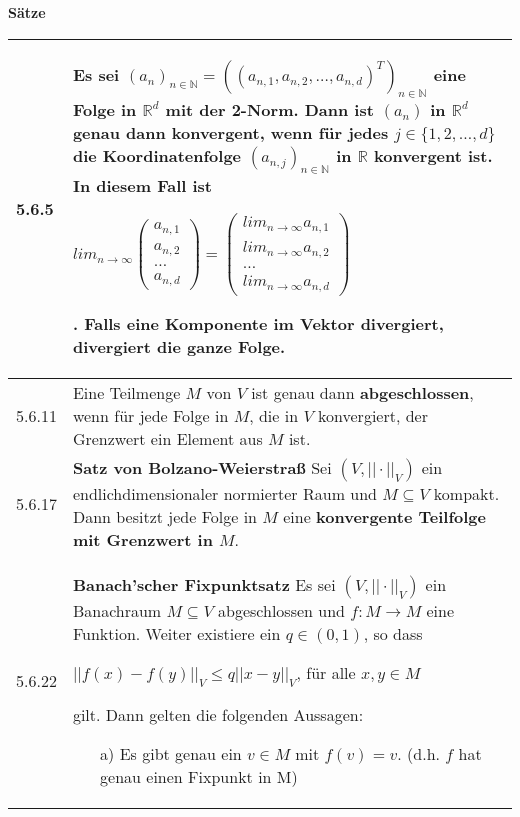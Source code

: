 \noindent 
\textbf{Sätze}
\begin{table}[H]
\begin{tabularx}{\textwidth}{X m{16cm}}
    \toprule

    5.6.5 & Es sei $(a_n)_{n \in \mathbb{N}} = ((a_{n,1}, a_{n,2}, \dots, a_{n,d})^T)_{n \in \mathbb{N}}$ eine Folge in $\mathbb{R}^d$
            mit der 2-Norm. Dann ist $(a_n)$ in $\mathbb{R}^d$ genau dann \textbf{konvergent}, wenn für jedes $j \in \{1,2,\dots,d\}$ die
            Koordinatenfolge $(a_{n,j})_{n \in \mathbb{N}}$ in $\mathbb{R}$ \textbf{konvergent} ist. In diesem Fall ist \hfill \break
            \centerline{$lim_{n \rightarrow \infty}\begin{pmatrix}a_{n,1}\\a_{n,2}\\\dots \\ a_{n,d}\end{pmatrix} =
                \begin{pmatrix} lim_{n \rightarrow \infty} a_{n,1} \\ lim_{n \rightarrow \infty} a_{n,2} \\ \dots \\
                lim_{n \rightarrow \infty} a_{n,d} \end{pmatrix}$}.
            Falls eine Komponente im Vektor divergiert, divergiert die ganze Folge. \\
    \midrule
    5.6.11& Eine Teilmenge $M$ von $V$ ist genau dann \textbf{abgeschlossen}, wenn für jede Folge in $M$, die in $V$ konvergiert,
            der Grenzwert ein Element aus $M$ ist. \\
    \midrule
    5.6.17& \textbf{Satz von Bolzano-Weierstra\ss} \hfill \break
            Sei $(V, ||\cdot||_V)$ ein endlichdimensionaler normierter Raum und $M \subseteq V$ kompakt. Dann besitzt jede Folge in $M$
            eine \textbf{konvergente Teilfolge mit Grenzwert in $M$}. \\
    \midrule
    5.6.22& \textbf{Banach'scher Fixpunktsatz} \hfill \break
            Es sei $(V, ||\cdot||_V)$ ein Banachraum $M \subseteq V$ abgeschlossen und $f: M \rightarrow M$ eine Funktion.
            Weiter existiere ein $q \in (0,1)$, so dass \hfill \break
            \centerline{$||f(x) - f(y)||_V \leq q ||x-y||_V$, für alle $x,y \in M$}
            gilt. Dann gelten die folgenden Aussagen:
            \begin{itemize}[topsep=-0.5cm]
                \item[a)] Es gibt genau ein $v \in M$ mit $f(v) = v$. (d.h. $f$ hat genau einen Fixpunkt in M)

\end{itemize}
\end{tabularx}
\end{table}
